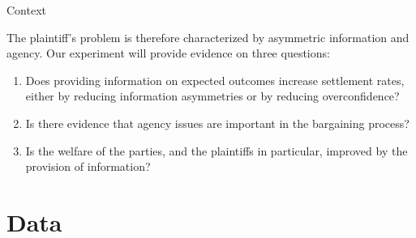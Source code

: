 \documentclass[9pt]{beamer}
\begin{document}
 




   
  
  


 

\begin{frame}{Context}

The plaintiff's problem is therefore characterized by asymmetric information and agency. Our experiment will provide evidence on three questions: 
\begin{enumerate}
      \item Does providing information on expected outcomes increase settlement rates, either by reducing information asymmetries or by reducing overconfidence? 
      \item Is there evidence that agency issues are important in the bargaining process?
      \item Is the welfare of the parties, and the plaintiffs in particular, improved by the provision of information? 
  \end{enumerate}
 
 
\end{frame}

\section{Data}
\end{document}
